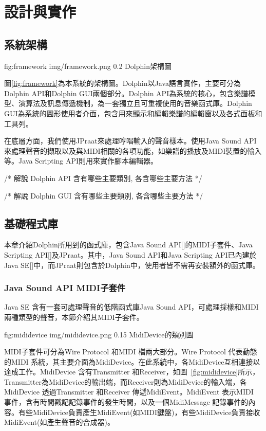 \documentclass[12pt,a4paper,oneside]{report}
\begin{document}
\chapter{設計與實作} 

\section{系統架構}


\figurewithcaption
{fig:framework}
{img/framework.png}
{0.2}
{Dolphin架構圖}

圖\ref{fig:framework}為本系統的架構圖。Dolphin以Java語言實作，主要可分為Dolphin API和Dolphin GUI兩個部分。Dolphin API為系統的核心，包含樂譜模型、演算法及訊息傳遞機制，為一套獨立且可重複使用的音樂函式庫。Dolphin GUI為系統的圖形使用者介面，包含用來顯示和編輯樂譜的編輯窗以及各式面板和工具列。

在底層方面，我們使用JPraat來處理哼唱輸入的聲音樣本。使用Java Sound API來處理聲音的擷取以及與MIDI相關的各項功能，如樂譜的播放及MIDI裝置的輸入等。Java Scripting API則用來實作腳本編輯器。


/* 
解說 Dolphin API 含有哪些主要類別, 各含哪些主要方法
*/

/* 
解說 Dolphin GUI 含有哪些主要類別, 各含哪些主要方法
*/

\section{基礎程式庫}

本章介紹Dolphin所用到的函式庫，包含Java Sound API[]的MIDI子套件、Java Scripting API[]及JPraat。其中，Java Sound API和Java Scripting API已內建於Java SE[]中，而JPraat則包含於Dolphin中，使用者皆不需再安裝額外的函式庫。

\subsection{Java Sound API MIDI子套件}

Java SE 含有一套可處理聲音的低階函式庫Java Sound API，可處理採樣和MIDI兩種類型的聲音，本節介紹其MIDI子套件。

\figurewithcaption
{fig:mididevice}
{img/mididevice.png}
{0.15}
{MidiDevice的類別圖}

MIDI子套件可分為Wire Protocol 和MIDI 檔兩大部分。Wire Protocol 代表動態的MIDI 系統，其主要介面為MidiDevice。在此系統中，各MidiDevice互相連接以達成工作。MidiDevice 含有Transmitter 和Receiver，如圖~\ref{fig:mididevice}所示，Transmitter為MidiDevice的輸出端，而Receiver則為MidiDevice的輸入端，各MidiDevice 透過Transmitter 和Receiver 傳遞MidiEvent。MidiEvent 表示MIDI 事件，含有時間戳記記錄事件的發生時間，以及一個MidiMessage 記錄事件的內容。有些MidiDevice負責產生MidiEvent(如MIDI鍵盤)，有些MidiDevice負責接收MidiEvent(如產生聲音的合成器)。
\end{document}
